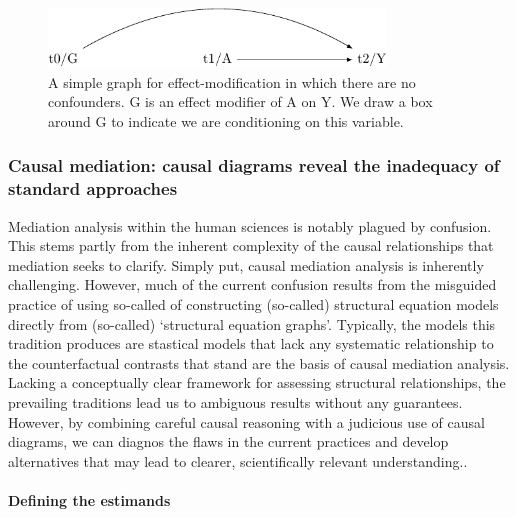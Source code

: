 \documentclass[
  singlecolumn,
  9pt]{article}
\let\oldparagraph\paragraph
\renewcommand{\paragraph}[1]{\oldparagraph{#1}\mbox{}}
\begin{document}
\begin{figure}

{\centering \includegraphics[width=0.8\textwidth,height=\textheight]{causal-dags_files/figure-pdf/fig-dag-effect-modfication-1.pdf}

}

\caption{\label{fig-dag-effect-modfication}A simple graph for
effect-modification in which there are no confounders. G is an effect
modifier of A on Y. We draw a box around G to indicate we are
conditioning on this variable.}

\end{figure}

\subsubsection{Causal mediation: causal diagrams reveal the inadequacy
of standard
approaches}\label{causal-mediation-causal-diagrams-reveal-the-inadequacy-of-standard-approaches}

Mediation analysis within the human sciences is notably plagued by
confusion. This stems partly from the inherent complexity of the causal
relationships that mediation seeks to clarify. Simply put, causal
mediation analysis is inherently challenging. However, much of the
current confusion results from the misguided practice of using so-called
of constructing (so-called) structural equation models directly from
(so-called) `structural equation graphs'. Typically, the models this
tradition produces are stastical models that lack any systematic
relationship to the counterfactual contrasts that stand are the basis of
causal mediation analysis. Lacking a conceptually clear framework for
assessing structural relationships, the prevailing traditions lead us to
ambiguous results without any guarantees. However, by combining careful
causal reasoning with a judicious use of causal diagrams, we can diagnos
the flaws in the current practices and develop alternatives that may
lead to clearer, scientifically relevant understanding..

\paragraph{Defining the estimands}\label{defining-the-estimands}
\end{document}
